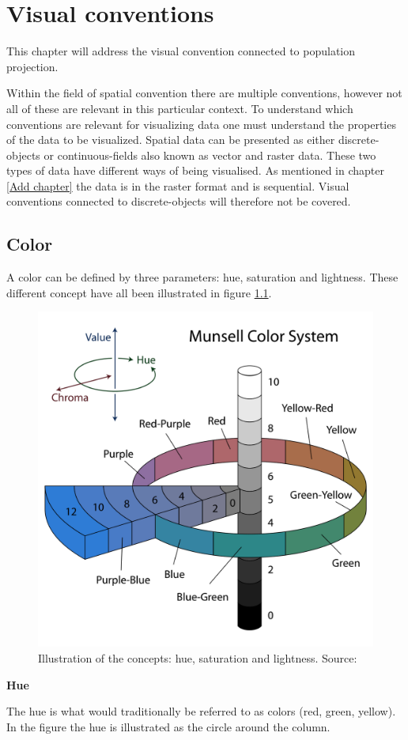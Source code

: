 \chapter{Visual conventions}
This chapter will address the visual convention connected to population projection. 

Within the field of spatial convention there are multiple conventions, however not all of these are relevant in this particular context. To understand which conventions are relevant for visualizing data one must understand the properties of the data to be visualized. Spatial data can be presented as either discrete-objects or continuous-fields also known as vector and raster data. \citep{objectsNFields} These two types of data have different ways of being visualised. 
As mentioned in chapter \ref{Add chapter} the data is in the raster format and is sequential. Visual conventions connected to discrete-objects will therefore not be covered.




\section{Color}
A color can be defined by three parameters: hue, saturation and lightness. These different concept have all been illustrated in figure \ref{MunsellColorSystem}.

\begin{figure} [H]
	\centering
	\includegraphics[width=.4\textwidth]{Pictures/MunsellColorSystem}
	\caption{Illustration of the concepts: hue, saturation and lightness. Source: \citet{JacobRus}}
	\label{MunsellColorSystem}
\end{figure}

\textbf{Hue}

The hue is what would traditionally be referred to as colors (red, green, yellow). In the figure the hue is illustrated as the circle around the column.

